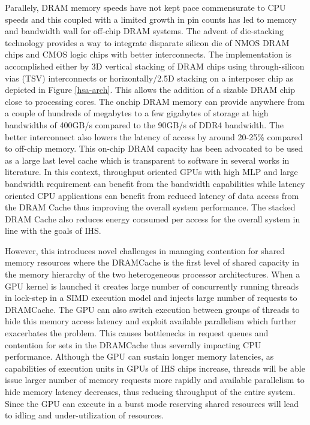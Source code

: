 \par Parallely, DRAM memory speeds have not kept pace commensurate to CPU speeds and this coupled with a limited growth in pin counts has led to memory \cite{memory-wall} and bandwidth wall \cite{bandwidth-wall} for off-chip DRAM systems. The advent of die-stacking technology \cite{3d-stacking} provides a way to integrate disparate silicon die of NMOS DRAM chips and CMOS logic chips with better interconnects. The implementation is accomplished either by 3D vertical stacking of DRAM chips using through-silicon vias (TSV) interconnects or horizontally/2.5D stacking on a interposer chip as depicted in Figure \ref{hsa-arch}. This allows the addition of a sizable DRAM chip close to processing cores. The onchip DRAM memory can provide anywhere from a couple of hundreds of megabytes to a few gigabytes of storage at high bandwidths of 400GB/s compared to the 90GB/s of DDR4 bandwidth. The better interconnect also lowers the latency of access by around 20-25\% compared to off-chip memory. This on-chip DRAM capacity has been advocated to be used as a large last level cache which is transparent to software in several works in literature. In this context, throughput oriented GPUs with high MLP and large bandwidth requirement can benefit from the bandwidth capabilities while latency oriented CPU applications can benefit from reduced latency of data access from the DRAM Cache thus improving the overall system performance. The stacked DRAM Cache also reduces energy consumed per access for the overall system in line with the goals of IHS.
\par However, this introduces novel challenges in managing contention for shared memory resources where the DRAMCache is the first level of shared capacity in the memory hierarchy of the two heterogeneous processor architectures. When a GPU kernel is launched it creates large number of concurrently running threads in lock-step in a SIMD execution model and injects large number of requests to DRAMCache. The GPU can also switch execution between groups of threads to hide this memory access latency and exploit available parallelism which further exacerbates the problem. This causes bottlenecks in request queues and contention for sets in the DRAMCache thus severally impacting CPU performance. Although the GPU can sustain longer memory latencies, as capabilities of execution units in GPUs of IHS chips increase, threads will be able issue larger number of memory requests more rapidly and available parallelism to hide memory latency decreases, thus reducing throughput of the entire system. Since the GPU can execute in a burst mode reserving shared resources will lead to idling and under-utilization of resources.

